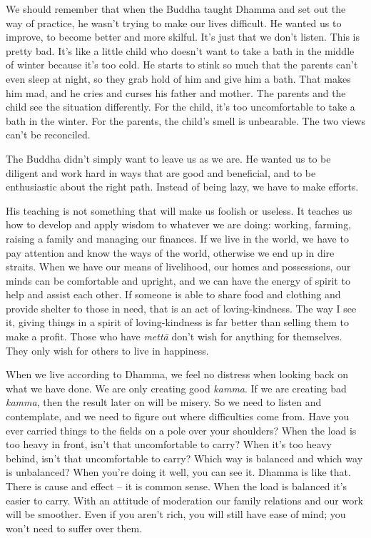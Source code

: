 We should remember that when the Buddha taught Dhamma and set out the
way of practice, he wasn't trying to make our lives difficult. He wanted
us to improve, to become better and more skilful. It's just that we
don't listen. This is pretty bad. It's like a little child who doesn't
want to take a bath in the middle of winter because it's too cold. He
starts to stink so much that the parents can't even sleep at night, so
they grab hold of him and give him a bath. That makes him mad, and he
cries and curses his father and mother. The parents and the child see
the situation differently. For the child, it's too uncomfortable to take
a bath in the winter. For the parents, the child's smell is unbearable. 
The two views can't be reconciled. 

The Buddha didn't simply want to leave us as we are. He wanted us to be
diligent and work hard in ways that are good and beneficial, and to be
enthusiastic about the right path. Instead of being lazy, we have to
make efforts. 

His teaching is not something that will make us foolish or useless. It
teaches us how to develop and apply wisdom to whatever we are doing: 
working, farming, raising a family and managing our finances. If we live
in the world, we have to pay attention and know the ways of the world, 
otherwise we end up in dire straits. When we have our means of
livelihood, our homes and possessions, our minds can be comfortable and
upright, and we can have the energy of spirit to help and assist each
other. If someone is able to share food and clothing and provide shelter
to those in need, that is an act of loving-kindness. The way I see it, 
giving things in a spirit of loving-kindness is far better than selling
them to make a profit. Those who have \emph{mettā} don't wish for
anything for themselves. They only wish for others to live in happiness. 

When we live according to Dhamma, we feel no distress when looking back
on what we have done. We are only creating good \emph{kamma}. If we are
creating bad \emph{kamma}, then the result later on will be misery. So
we need to listen and contemplate, and we need to figure out where
difficulties come from. Have you ever carried things to the fields on a
pole over your shoulders? When the load is too heavy in front, isn't
that uncomfortable to carry? When it's too heavy behind, isn't that
uncomfortable to carry? Which way is balanced and which way is
unbalanced? When you're doing it well, you can see it. Dhamma is like
that. There is cause and effect -- it is common sense. When the load is
balanced it's easier to carry. With an attitude of moderation our family
relations and our work will be smoother. Even if you aren't rich, you
will still have ease of mind; you won't need to suffer over them. 

